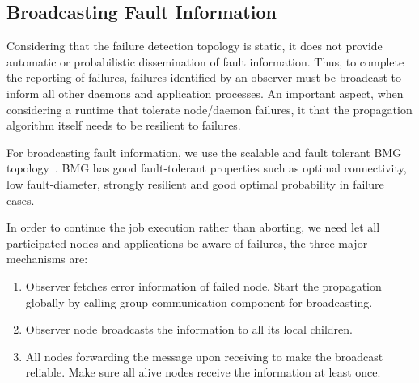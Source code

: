 \documentclass[sigconf]{acmart}
\begin{document}

\subsection{Broadcasting Fault Information}
Considering that the failure detection topology is static, it does not provide 
automatic or probabilistic dissemination of fault information. Thus, to complete 
the reporting of failures, failures identified by an observer must be broadcast 
to inform all other daemons and application processes. An important aspect,
when considering a runtime that tolerate node/daemon failures, it that the 
propagation algorithm itself needs to be resilient to failures. 

For broadcasting fault information, we use the scalable and fault tolerant BMG topology~\cite{Angskun07}. BMG has good fault-tolerant properties such as optimal connectivity, low fault-diameter, strongly resilient and good optimal probability in failure cases.


 In order to continue the job execution rather than aborting, we need let all participated nodes and applications be aware of failures, the three major mechanisms are: 
\begin{enumerate}
  \item Observer fetches error information of failed node. Start the propagation globally by calling group communication component for broadcasting.
  \item Observer node broadcasts the information to all its local children. 
  \item All nodes forwarding the message upon receiving to make the broadcast reliable. Make sure all alive nodes receive the information at least once. 
\end{enumerate}
\end{document}
